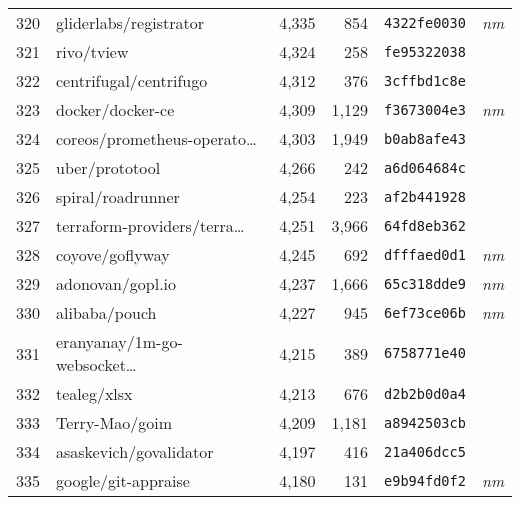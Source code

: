 {\begin{supertabular}{llrrll}
        320 &             gliderlabs/registrator &  4,335 &    854 &  \texttt{4322fe0030} &  \textit{nm} \\
        321 &                         rivo/tview &  4,324 &    258 &  \texttt{fe95322038} &              \\
        322 &             centrifugal/centrifugo &  4,312 &    376 &  \texttt{3cffbd1c8e} &              \\
        323 &                   docker/docker-ce &  4,309 &  1,129 &  \texttt{f3673004e3} &  \textit{nm} \\
        324 &    coreos/prometheus-operato\ldots &  4,303 &  1,949 &  \texttt{b0ab8afe43} &              \\
        325 &                     uber/prototool &  4,266 &    242 &  \texttt{a6d064684c} &              \\
        326 &                  spiral/roadrunner &  4,254 &    223 &  \texttt{af2b441928} &              \\
        327 &    terraform-providers/terra\ldots &  4,251 &  3,966 &  \texttt{64fd8eb362} &              \\
        328 &                    coyove/goflyway &  4,245 &    692 &  \texttt{dfffaed0d1} &  \textit{nm} \\
        329 &                   adonovan/gopl.io &  4,237 &  1,666 &  \texttt{65c318dde9} &  \textit{nm} \\
        330 &                      alibaba/pouch &  4,227 &    945 &  \texttt{6ef73ce06b} &  \textit{nm} \\
        331 &    eranyanay/1m-go-websocket\ldots &  4,215 &    389 &  \texttt{6758771e40} &              \\
        332 &                        tealeg/xlsx &  4,213 &    676 &  \texttt{d2b2b0d0a4} &              \\
        333 &                     Terry-Mao/goim &  4,209 &  1,181 &  \texttt{a8942503cb} &              \\
        334 &             asaskevich/govalidator &  4,197 &    416 &  \texttt{21a406dcc5} &              \\
        335 &                google/git-appraise &  4,180 &    131 &  \texttt{e9b94fd0f2} &  \textit{nm} \\

\end{supertabular}}
